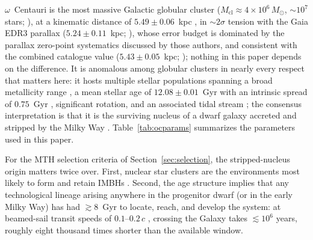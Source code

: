 \documentclass[11pt]{article}
\newcommand{\msun}{\ensuremath{M_\odot}}
\begin{document}
$\omega$~Centauri is the most massive Galactic globular cluster ($M_{\mathrm{cl}} \approx 4\times10^{6}\,\msun$, $\sim$$10^{7}$ stars; \citealt{Harris1996}), at a kinematic distance of $5.49 \pm 0.06$~kpc \citep{Haberle2025oMEGACatVI}, in $\sim$$2\sigma$ tension with the Gaia EDR3 parallax ($5.24\pm0.11$~kpc; \citealt{Soltis2021}), whose error budget is dominated by the parallax zero-point systematics discussed by those authors, and consistent with the combined catalogue value ($5.43\pm0.05$~kpc; \citealt{BaumgardtVasiliev2021}); nothing in this paper depends on the difference. It is anomalous among globular clusters in nearly every respect that matters here: it hosts multiple stellar populations spanning a broad metallicity range \citep{JohnsonPilachowski2010}, a mean stellar age of $12.08\pm0.01$~Gyr with an intrinsic spread of $0.75$~Gyr \citep{Clontz2024}, significant rotation, and an associated tidal stream \citep{Ibata2019}; the consensus interpretation is that it is the surviving nucleus of a dwarf galaxy accreted and stripped by the Milky Way \citep{HilkerRichtler2000,BekkiTsujimoto2019,Souza2026oMEGACatX}. Table~\ref{tab:ocparams} summarizes the parameters used in this paper.

For the MTH selection criteria of Section~\ref{sec:selection}, the stripped-nucleus origin matters twice over. First, nuclear star clusters are the environments most likely to form and retain IMBHs \citep{Greene2020}. Second, the age structure implies that any technological lineage arising anywhere in the progenitor dwarf (or in the early Milky Way) has had $\gtrsim$8~Gyr to locate, reach, and develop the system: at beamed-sail transit speeds of $0.1$--$0.2\,c$ \citep{Lubin2016}, crossing the Galaxy takes $\lesssim 10^{6}$ years, roughly eight thousand times shorter than the available window.
\end{document}
